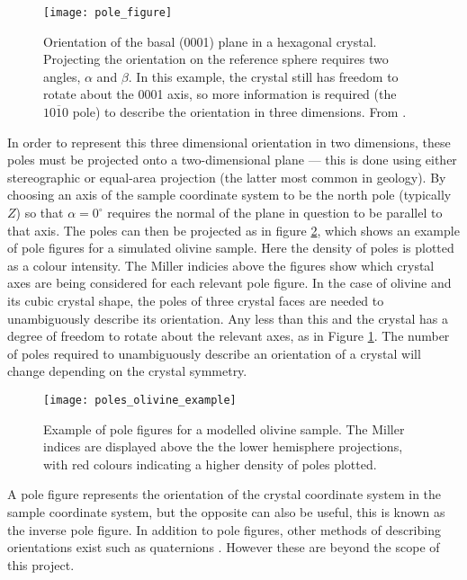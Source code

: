 \documentclass[a4paper,12pt]{report}
\numberwithin{equation}{chapter}
\begin{document}
\begin{figure}[h!]
  \centering
    \texttt{[image: pole\_figure]}
  \caption[Pole figure visualisation]{Orientation of the basal (0001) plane in a hexagonal crystal. Projecting the orientation on the reference sphere requires two angles, $\alpha$ and $\beta$. In this example, the crystal still has freedom to rotate about the 0001 axis, so more information is required (the $\mathit{10\overline{1}0}$ pole) to describe the orientation in three dimensions. From \cite{Randle2000}.}
  \label{fig:spherical_orientation}
\end{figure}



In order to represent this three dimensional orientation in two dimensions, these poles must be projected onto a two-dimensional plane --- this is done using either stereographic or equal-area projection (the latter most common in geology). By choosing an axis of the sample coordinate system to be the north pole (typically $Z$) so that $\alpha = 0^\circ$ requires the normal of the plane in question to be parallel to that axis. The poles can then be projected as in figure \ref{fig:pole_olivine_example}, which shows an example of pole figures for a simulated olivine sample. Here the density of poles is plotted as a colour intensity. The Miller indicies above the figures show which crystal axes are being considered for each relevant pole figure. In the case of olivine and its cubic crystal shape, the poles of three crystal faces are needed to unambiguously describe its orientation. Any less than this and the crystal has a degree of freedom to rotate about the relevant axes, as in Figure \ref{fig:spherical_orientation}. The number of poles required to unambiguously describe an orientation of a crystal will change depending on the crystal symmetry.




\begin{figure}[h]
  \centering
    \texttt{[image: poles\_olivine\_example]}
  \caption[Pole figure olivine example]{Example of pole figures for a modelled olivine sample. The Miller indices are displayed above the the lower hemisphere projections, with red colours indicating a higher density of poles plotted.}
  \label{fig:pole_olivine_example}
\end{figure}




A pole figure represents the orientation of the crystal coordinate system in the sample coordinate system, but the opposite can also be useful, this is known as the inverse pole figure. In addition to pole figures, other methods of describing orientations exist such as quaternions \citep{Quaternions}. However these are beyond the scope of this project. 
\end{document}
